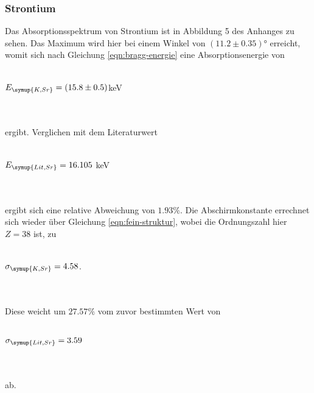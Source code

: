         \subsubsection{Strontium}
            Das Absorptionsspektrum von Strontium ist in Abbildung 5 des Anhanges zu sehen.
            Das Maximum wird hier bei einem Winkel von $(11.2 \pm 0.35)°$ erreicht, womit sich nach 
            Gleichung \eqref{eqn:bragg-energie} eine Absorptionsenergie von 
            \\ \\
            \centerline{$E_{\symup{K, Sr}} = (15.8 \pm 0.5)$keV}  
            \\ \\
            ergibt. Verglichen mit dem Literaturwert
            \\ \\
            \centerline{$E_{\symup{Lit, Sr}} = 16.105$ keV \cite{periodic}}
            \\ \\
            ergibt sich eine relative Abweichung von $1.93 \%$. Die Abschirmkonstante
            errechnet sich wieder über Gleichung \eqref{eqn:fein-struktur}, wobei die
            Ordnungszahl hier $Z = 38$ ist, zu
            \\ \\
            \centerline{$\sigma_{\symup{K, Sr}} = 4.58$.} 
            \\ \\
            Diese weicht um $27.57 \%$ vom zuvor bestimmten Wert von 
            \\ \\
            \centerline{$\sigma_{\symup{Lit, Sr}} = 3.59$}
            \\ \\
            ab.

